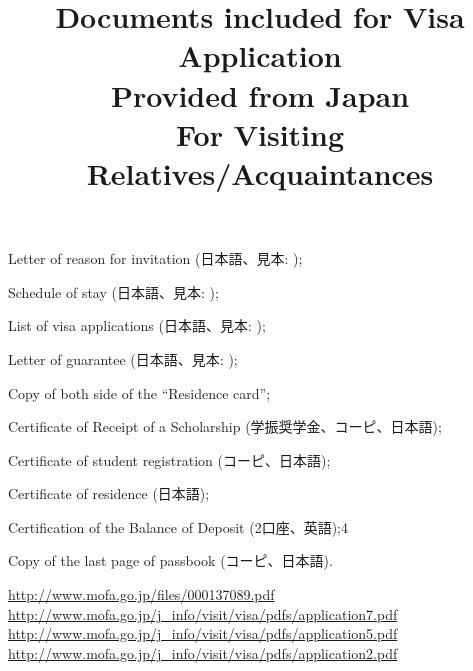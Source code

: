 \documentclass[12pt]{article} %
\title{Documents included for Visa Application\\Provided from Japan\\For Visiting Relatives/Acquaintances}
\newcommand{\cmark}{\ding{51}}%
\newcommand{\done}{\rlap{$\square$}{\raisebox{2pt}{\large\hspace{1pt}\cmark}}%
\hspace{-2.5pt}}
\begin{document}
\maketitle
\begin{todolist}
	\item[\done] Letter of reason for invitation (日本語、見本: \cite{reasonletter});
	\item Schedule of stay (日本語、見本: \cite{schedule});
	\item[\done] List of visa applications (日本語、見本: \cite{applicantlist});
	\item[\done] Letter of guarantee (日本語、見本: \cite{guarantee});
	\item[\done] Copy of both side of the ``Residence card'';
	\item[\done] Certificate of Receipt of a Scholarship (学振奨学金、コーピ、日本語);
	\item[\done] Certificate of student registration (コーピ、日本語);
	\item[\done] Certificate of residence (日本語);
	\item[\done] Certification of the Balance of Deposit (2口座、英語);4
	\item[\done] Copy of the last page of passbook (コーピ、日本語).
\end{todolist}

\begin{thebibliography}{9}
	\url{http://www.mofa.go.jp/files/000137089.pdf}
	\url{http://www.mofa.go.jp/j_info/visit/visa/pdfs/application7.pdf}
	\url{http://www.mofa.go.jp/j_info/visit/visa/pdfs/application5.pdf}
	\url{http://www.mofa.go.jp/j_info/visit/visa/pdfs/application2.pdf}
\end{thebibliography}
\end{document}
